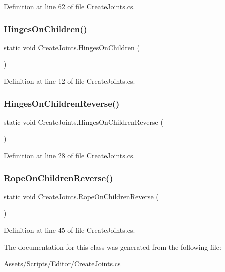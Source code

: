 Definition at line 62 of file Create\+Joints.\+cs.

\mbox{\label{class_create_joints_ab66cd27a24594e2a647456a799e43168}} 
\subsubsection{\texorpdfstring{Hinges\+On\+Children()}{HingesOnChildren()}}
{\footnotesize\ttfamily static void Create\+Joints.\+Hinges\+On\+Children (\begin{DoxyParamCaption}{ }\end{DoxyParamCaption})\hspace{0.3cm}{\ttfamily [static]}}



Definition at line 12 of file Create\+Joints.\+cs.

\mbox{\label{class_create_joints_a62f6e599596a76ffc0143445f0f42776}} 
\subsubsection{\texorpdfstring{Hinges\+On\+Children\+Reverse()}{HingesOnChildrenReverse()}}
{\footnotesize\ttfamily static void Create\+Joints.\+Hinges\+On\+Children\+Reverse (\begin{DoxyParamCaption}{ }\end{DoxyParamCaption})\hspace{0.3cm}{\ttfamily [static]}}



Definition at line 28 of file Create\+Joints.\+cs.

\mbox{\label{class_create_joints_a28fad472b33b9fcad21a4791e43d3892}} 
\subsubsection{\texorpdfstring{Rope\+On\+Children\+Reverse()}{RopeOnChildrenReverse()}}
{\footnotesize\ttfamily static void Create\+Joints.\+Rope\+On\+Children\+Reverse (\begin{DoxyParamCaption}{ }\end{DoxyParamCaption})\hspace{0.3cm}{\ttfamily [static]}}



Definition at line 45 of file Create\+Joints.\+cs.



The documentation for this class was generated from the following file\+:\begin{DoxyCompactItemize}
\item 
Assets/\+Scripts/\+Editor/\mbox{\hyperlink{_create_joints_8cs}{Create\+Joints.\+cs}}\end{DoxyCompactItemize}
